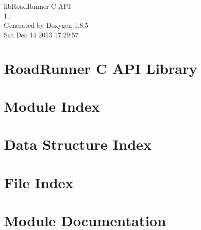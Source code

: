 \documentclass[twoside]{book}
\newcommand{\clearemptydoublepage}{%
  \newpage{\pagestyle{empty}\cleardoublepage}%
}
\begin{document}
\hypersetup{pageanchor=false}
\begin{titlepage}
\vspace*{7cm}
\begin{center}%
{\Large lib\-Road\-Runner C A\-P\-I \\[1ex]\large 1.. }\\
\vspace*{1cm}
{\large Generated by Doxygen 1.8.5}\\
\vspace*{0.5cm}
{\small Sat Dec 14 2013 17:29:57}\\
\end{center}
\end{titlepage}
\clearemptydoublepage
\tableofcontents
\clearemptydoublepage
{}
\hypersetup{pageanchor=true}

\chapter{Road\-Runner C A\-P\-I Library}
\label{index}\hypertarget{index}{}
\chapter{Module Index}

\chapter{Data Structure Index}

\chapter{File Index}

\chapter{Module Documentation}
























\end{document}
